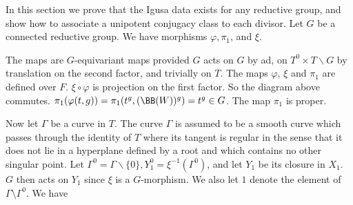 \documentclass{memo-l}
\theoremstyle{definition}
\theoremstyle{remark}
\numberwithin{section}{chapter}
\numberwithin{equation}{chapter}
\begin{document}
   In this section we prove that the Igusa data exists for any reductive
group, and show how to associate a unipotent conjugacy class to each divisor.
 Let $G$ be a connected reductive group.
 We have morphisms ${\varphi}, {\pi}_{1}$, and ${\xi}$.
\begin{figure}[htb]
\centering
{}
\end{figure}


\noindent
The maps are $G$-equivariant maps provided $G$ acts on $G$ by ad, on $T^{0}
\times T\backslash G$ by translation on the second factor, and trivially on $T$.
 The maps ${\varphi}$, ${\xi}$ and ${\pi}_{1}$ are defined over $F$.
${\xi\circ\varphi}$ is projection on the first factor.
 So the diagram above commutes.
${\pi}_{1}({\varphi}(t,g)) = {\pi}_{1}(t^{g},({\BB}(W))^{g}) = t^{g} \in G$.
 The map ${\pi}_{1}$ is proper.

   Now let ${\Gamma}$ be a curve in $T$.
 The curve ${\Gamma}$ is assumed to be a smooth curve which passes through the
identity of $T$ where its tangent is regular in the sense that it does not
lie in a hyperplane defined by a root and which contains no other singular
point.
 Let ${\Gamma}^{0}={\Gamma}\backslash \{0\}, Y_{1}^{0}={\xi}^{-1}({\Gamma}^{0})$,
and let $Y_{1}$ be its closure in $X_{1}$.
 $G$ then acts on $Y_{1}$ since ${\xi}$ is a $G$-morphism.  We also let $1$
 denote the element of $\Gamma\setminus\Gamma^0$.
 We have

\begin{figure}[htb]
\centering
{}
\end{figure}
\end{document}
